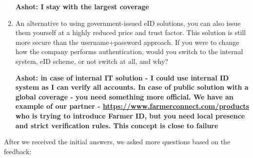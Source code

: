 \begin{enumerate}
    \textbf{Ashot: I stay with the largest coverage }
    \item An alternative to using government-issued eID solutions, you can also issue them yourself at a highly reduced price and trust factor. This solution is still more secure than the username+password approach. If you were to change how the company performs authentication, would you switch to the internal system, eID scheme, or not switch at all, and why?
    
    \textbf{Ashot: in case of internal IT solution - I could use internal ID system as I can verify all accounts. In case of public solution with a global coverage - you need something more official. We have an example of our partner - \url{https://www.farmerconnect.com/products} who is trying to introduce Farmer ID, but you need local presence and strict verification rules. This concept is close to failure}
\end{enumerate}

After we received the initial answers, we asked more questions based on the feedback:

